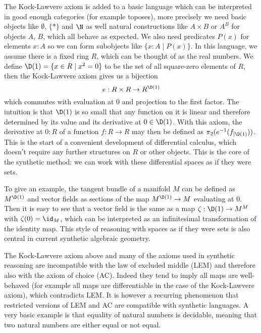 The Kock-Lawvere axiom is added to a basic language which can be interpreted in good enough categories (for example toposes), more precisely we need basic objects like $\emptyset$, $\{\ast\}$ and $\N$ as well natural constructions like $A\times B$ or $A^B$ for objects $A$, $B$, which all behave as expected. We also need predicates $P(x)$ for elements $x:A$ so we can form subobjects like $\{x:A\mid P(x)\}$.
In this language, we assume there is a fixed ring $R$, which can be thought of as the real numbers. We define $\D(1)=\{x\in R\mid x^2=0\}$ to be the set of all square-zero elements of $R$, then the Kock-Lawvere axiom gives us a bijection
\[ e : R \times R  \to R^{\D(1)} \]
which commutes with evaluation at $0$ and projection to the first factor.
The intuition is that $\D(1)$ is so small that any function on it is linear and therefore determined by its value and its derivative at $0\in\D(1)$.
With this axiom, the derivative at $0:R$ of a function $f : R \to R$ may then be defined as $\pi_2(e^{-1}(f_{\vert \D(1)}))$. This is the start of a convenient development of differential calculus, which doesn't require any further structures on $R$ or other objects. This is the core of the synthetic method: we can work with these differential spaces as if they were sets.

To give an example, the tangent bundle of a manifold $M$ can be defined as $M^{\D(1)}$ and vector fields as sections of the map $M^{\D(1)}\to M$ evaluating at $0$. Then it is easy to see that a vector field is the same as a map $\zeta:\D(1)\to M^M$ with $\zeta(0)=\id_M$, which can be interpreted as an infinitesimal transformation of the identity map. This style of reasoning with spaces as if they were sets is also central in current synthetic algebraic geometry. 

The Kock-Lawvere axiom above and many of the axioms used in synthetic reasoning are incompatible with the law of excluded middle (LEM) and therefore also with the axiom of choice (AC). Indeed they tend to imply all maps are well-behaved (for example all maps are differentiable in the case of the Kock-Lawvere axiom), which contradicts LEM. It is however a recurring phenomenon that restricted versions of LEM and AC are compatible with synthetic languages. A very basic example is that equality of natural numbers is decidable, meaning that two natural numbers are either equal or not equal. 



